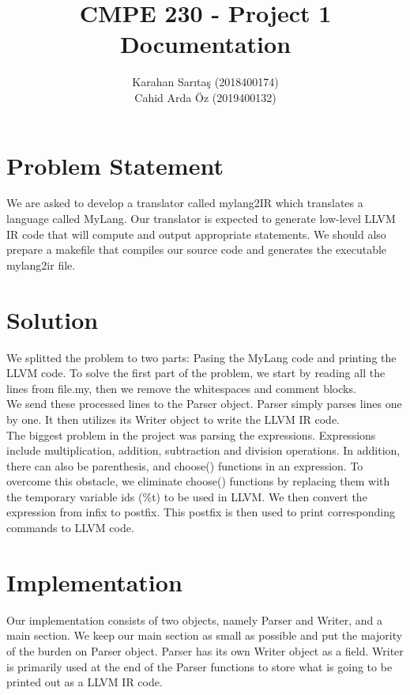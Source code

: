 \documentclass[12pt,a4paper]{article}
\title{CMPE 230 - Project 1 Documentation}
\author{Karahan Sarıtaş (2018400174) \\ Cahid Arda Öz (2019400132)}
\begin{document}
\maketitle

\tableofcontents
 
\section{Problem Statement}

We are asked to develop a translator called mylang2IR which translates a language called MyLang. Our translator is expected to generate low-level LLVM IR code that will compute and output appropriate statements. We should also prepare a makefile that compiles our source code and generates the executable mylang2ir file.

\section{Solution}
We splitted the problem to two parts: Pasing the MyLang code and printing the LLVM code. To solve the first part of the problem, we start by reading all the lines from file.my, then we remove the whitespaces and comment blocks. \\
We send these processed lines to the Parser object. Parser simply parses lines one by one.  It then utilizes its Writer object to write the LLVM IR code. \\
The biggest problem in the project was parsing the expressions. Expressions include multiplication, addition, subtraction and division operations. In addition, there can also be parenthesis, and choose() functions in an expression. To overcome this obstacle, we eliminate choose() functions by replacing them with the temporary variable ids (\%t) to be used in LLVM. We then convert the expression from infix to postfix. This postfix is then used to print corresponding commands to LLVM code. \\

\section{Implementation}
Our implementation consists of two objects, namely Parser and Writer, and a main section. We keep our main section as small as possible and put the majority of the burden on Parser object. Parser has its own Writer object as a field. Writer is primarily used at the end of the Parser functions to store what is going to be printed out as a LLVM IR code.
\end{document}
